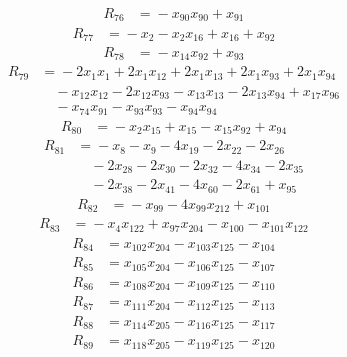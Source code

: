 \begin{align*}
R_{76}&={}-x_{90}x_{90} +x_{91}
\end{align*}
\begin{align*}
R_{77}&={}-x_{2} -x_{2}x_{16} +x_{16} +x_{92}
\end{align*}
\begin{align*}
R_{78}&={}-x_{14}x_{92} +x_{93}
\end{align*}
\begin{align*}
R_{79}&={}-2x_{1}x_{1} +2x_{1}x_{12} +2x_{1}x_{13} +2x_{1}x_{93} +2x_{1}x_{94}\\
&\quad{}-x_{12}x_{12} -2x_{12}x_{93} -x_{13}x_{13} -2x_{13}x_{94} +x_{17}x_{96}\\
&\quad{}-x_{74}x_{91} -x_{93}x_{93} -x_{94}x_{94}
\end{align*}
\begin{align*}
R_{80}&={}-x_{2}x_{15} +x_{15} -x_{15}x_{92} +x_{94}
\end{align*}
\begin{align*}
R_{81}&={}-x_{8} -x_{9} -4x_{19} -2x_{22} -2x_{26}\\
&\quad{}-2x_{28} -2x_{30} -2x_{32} -4x_{34} -2x_{35}\\
&\quad{}-2x_{38} -2x_{41} -4x_{60} -2x_{61} +x_{95}
\end{align*}
\begin{align*}
R_{82}&={}-x_{99} -4x_{99}x_{212} +x_{101}
\end{align*}
\begin{align*}
R_{83}&={}-x_{4}x_{122} +x_{97}x_{204} -x_{100} -x_{101}x_{122}
\end{align*}
\begin{align*}
R_{84}&={}x_{102}x_{204} -x_{103}x_{125} -x_{104}
\end{align*}
\begin{align*}
R_{85}&={}x_{105}x_{204} -x_{106}x_{125} -x_{107}
\end{align*}
\begin{align*}
R_{86}&={}x_{108}x_{204} -x_{109}x_{125} -x_{110}
\end{align*}
\begin{align*}
R_{87}&={}x_{111}x_{204} -x_{112}x_{125} -x_{113}
\end{align*}
\begin{align*}
R_{88}&={}x_{114}x_{205} -x_{116}x_{125} -x_{117}
\end{align*}
\begin{align*}
R_{89}&={}x_{118}x_{205} -x_{119}x_{125} -x_{120}
\end{align*}

